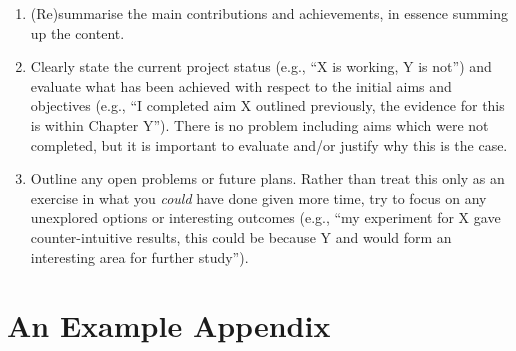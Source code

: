 \documentclass[ %
                    author={Sam Phippen},
                supervisor={Dr. Rafal Bogacz},
                     title={Real time voice activity detectors in noisy personal computing environments},
                  subtitle={},
                    degree={MEng},
                      year={2012} ]{thesis}
\begin{document}
\begin{enumerate}
\item (Re)summarise the main contributions and achievements, in essence
      summing up the content.
\item Clearly state the current project status (e.g., ``X is working, Y 
      is not'') and evaluate what has been achieved with respect to the 
      initial aims and objectives (e.g., ``I completed aim X outlined 
      previously, the evidence for this is within Chapter Y'').  There 
      is no problem including aims which were not completed, but it is 
      important to evaluate and/or justify why this is the case.
\item Outline any open problems or future plans.  Rather than treat this
      only as an exercise in what you {\em could} have done given more 
      time, try to focus on any unexplored options or interesting outcomes
      (e.g., ``my experiment for X gave counter-intuitive results, this 
      could be because Y and would form an interesting area for further 
      study'').
\end{enumerate}


%
%

\backmatter





\appendix

\chapter{An Example Appendix}
\label{appx:example}
\end{document}
